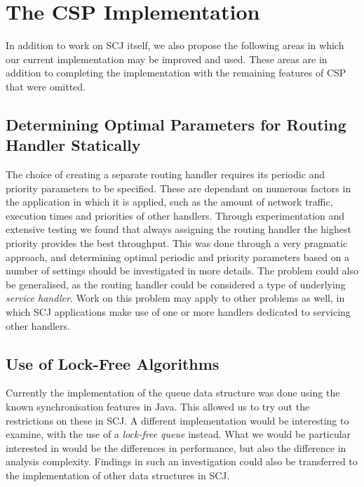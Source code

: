 

\section{The CSP Implementation} %
\label{sec:the_csp_implementation}
In addition to work on SCJ itself, we also propose the following areas in which our current implementation may be improved and used. These areas are in addition to completing the implementation with the remaining features of CSP that were omitted.

\subsection{Determining Optimal Parameters for Routing Handler Statically} %
\label{sub:determining_optimal_parameters_for_routing_handler_statically}
The choice of creating a separate routing handler requires its periodic and priority parameters to be specified. These are dependant on numerous factors in the application in which it is applied, such as the amount of network traffic, execution times and priorities of other handlers. Through experimentation and extensive testing we found that always assigning the routing handler the highest priority provides the best throughput. This was done through a very pragmatic approach, and determining optimal periodic and priority parameters based on a number of settings should be investigated in more details. The problem could also be generalised, as the routing handler could be considered a type of underlying \textit{service handler}. Work on this problem may apply to other problems as well, in which SCJ applications make use of one or more handlers dedicated to servicing other handlers.

\subsection{Use of Lock-Free Algorithms} %
\label{sub:lock_free_algorithms}
Currently the implementation of the queue data structure was done using the known synchronisation features in Java. This allowed us to try out the restrictions on these in SCJ. A different implementation would be interesting to examine, with the use of a \textit{lock-free queue} instead\cite{Valois94implementinglock-free}\cite{Michael:1996:SFP:248052.248106}. What we would be particular interested in would be the differences in performance, but also the difference in analysis complexity. Findings in such an investigation could also be transferred to the implementation of other data structures in SCJ.

